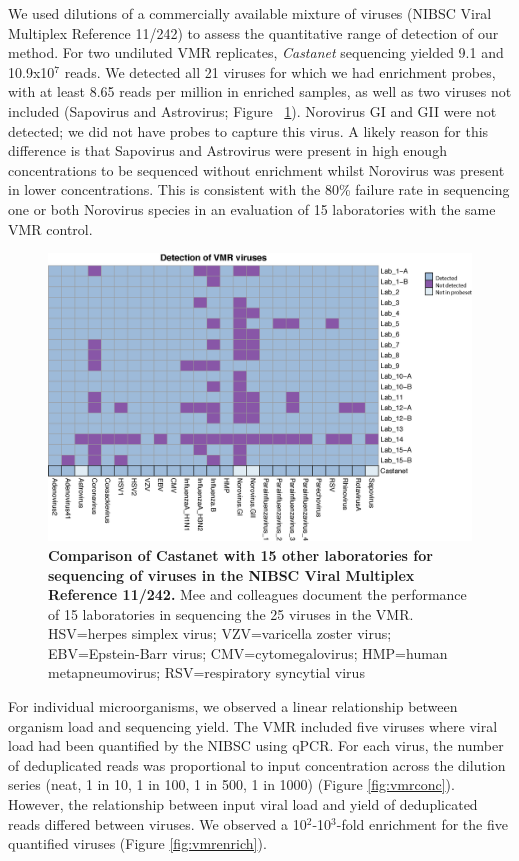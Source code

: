 We used dilutions of a commercially available mixture of viruses (NIBSC Viral Multiplex Reference 11/242) to assess the quantitative range of detection of our method. For two undiluted VMR replicates, \textit{Castanet} sequencing yielded 9.1 and 10.9x10$^7$ reads. We detected all 21 viruses for which we had enrichment probes, with at least 8.65 reads per million in enriched samples, as well as two viruses not included (Sapovirus and Astrovirus; Figure ~\ref{fig:vmrheatmap}). Norovirus GI and GII were not detected; we did not have probes to capture this virus. A likely reason for this difference is that Sapovirus and Astrovirus were present in high enough concentrations to be sequenced without enrichment whilst Norovirus was present in lower concentrations. This is consistent with the 80\% failure rate in sequencing one or both Norovirus species in an evaluation of 15 laboratories with the same VMR control.

\begin{figure}[htbp]
\centering
\includegraphics[width=\textwidth]{./Results1/Images/vmr-heatmap.png}
\caption[Viral Multiplex Reference Heatmap]{\textbf{Comparison of Castanet with 15 other laboratories for sequencing of viruses in the NIBSC Viral Multiplex Reference 11/242.} Mee and colleagues document the performance of 15 laboratories in sequencing the 25 viruses in the VMR. HSV=herpes simplex virus; VZV=varicella zoster virus; EBV=Epstein-Barr virus; CMV=cytomegalovirus; HMP=human metapneumovirus; RSV=respiratory syncytial virus}
\label{fig:vmrheatmap}
\end{figure}

For individual microorganisms, we observed a linear relationship between organism load and sequencing yield. The VMR included five viruses where viral load had been quantified by the NIBSC using qPCR. For each virus, the number of deduplicated reads was proportional to input concentration across the dilution series (neat, 1 in 10, 1 in 100, 1 in 500, 1 in 1000) (Figure \ref{fig:vmrconc}). However, the relationship between input viral load and yield of deduplicated reads differed between viruses. We observed a 10$^2$-10$^3$-fold enrichment for the five quantified viruses (Figure \ref{fig:vmrenrich}).


